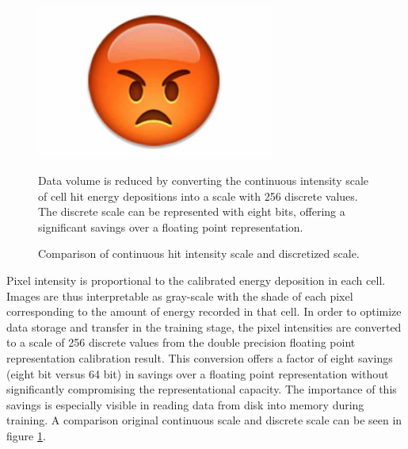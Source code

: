 \begin{figure}[t]
\begin{center}
\includegraphics[width=0.7\textwidth]{figures/dummy/dummy.jpg}
\end{center}
\caption{Comparison of continuous hit intensity scale and discretized scale.}{
Data volume is reduced by converting the continuous intensity scale of cell
hit energy depositions into a scale with 256 discrete values.
The discrete scale can be represented with eight bits, offering a significant
savings over a floating point representation.
}
\label{pixelmapadc}
\end{figure}


Pixel intensity is proportional to the calibrated energy deposition
in each cell.
Images are thus interpretable as gray-scale with the shade of
each pixel corresponding to the amount of energy recorded in that cell.
In order to optimize data storage and transfer in the training stage,
the pixel intensities are converted to a scale of 256 discrete values
from the double precision floating point representation calibration result.
This conversion offers a factor of eight savings (eight bit versus 64 bit) in
savings over a floating point representation
without significantly compromising the representational capacity.
The importance of this savings is especially visible in reading data from
disk into memory during training.
A comparison original continuous scale and discrete scale can be seen in figure
\ref{pixelmapadc}.

